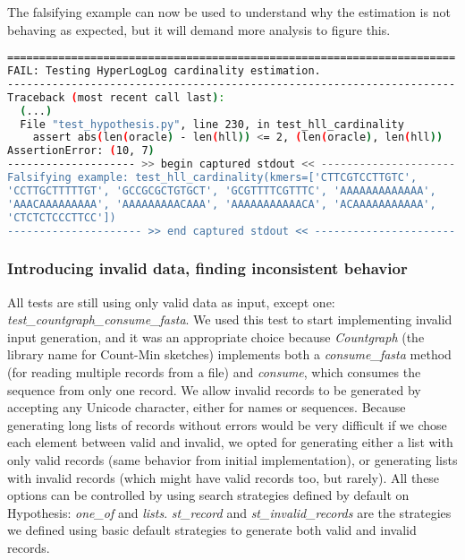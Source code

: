 \documentclass[preprint,nocopyrightspace]{sig-alternate}
\begin{document}
The falsifying example can now be used to understand why the estimation is not behaving as expected,
but it will demand more analysis to figure this.

\begin{lstlisting}[language=Bash,basicstyle=\tiny\tt,caption={HyperLogLog cardinality estimation test output, with falsifying example},label=hlltestoutput]
======================================================================
FAIL: Testing HyperLogLog cardinality estimation.
----------------------------------------------------------------------
Traceback (most recent call last):
  (...)
  File "test_hypothesis.py", line 230, in test_hll_cardinality
    assert abs(len(oracle) - len(hll)) <= 2, (len(oracle), len(hll))
AssertionError: (10, 7)
-------------------- >> begin captured stdout << ---------------------
Falsifying example: test_hll_cardinality(kmers=['CTTCGTCCTTGTC',
'CCTTGCTTTTTGT', 'GCCGCGCTGTGCT', 'GCGTTTTCGTTTC', 'AAAAAAAAAAAAA',
'AAACAAAAAAAAA', 'AAAAAAAAACAAA', 'AAAAAAAAAAACA', 'ACAAAAAAAAAAA',
'CTCTCTCCCTTCC'])
--------------------- >> end captured stdout << ----------------------
\end{lstlisting}

\subsubsection{Introducing invalid data, finding inconsistent behavior}

All tests are still using only valid data as input,
except one: \emph{test\_countgraph\_consume\_fasta}.
We used this test to start implementing invalid input generation,
and it was an appropriate choice because \emph{Countgraph} (the library name for Count-Min sketches)
implements both a \emph{consume\_fasta} method (for reading multiple records from a file) and \emph{consume},
which consumes the sequence from only one record.
We allow invalid records to be generated by accepting any Unicode character,
either for names or sequences.
Because generating long lists of records without errors would be very difficult if we chose each element between valid and invalid,
we opted for generating either a list with only valid records (same behavior from initial implementation),
or generating lists with invalid records (which might have valid records too, but rarely).
All these options can be controlled by using search strategies defined by default on Hypothesis:
\emph{one\_of} and \emph{lists}.
\emph{st\_record} and \emph{st\_invalid\_records} are the strategies we defined using basic default strategies to generate both valid and invalid records.
\end{document}
